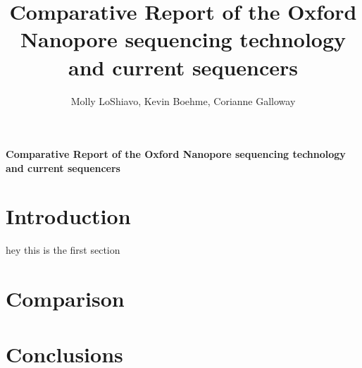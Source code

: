 \documentclass[10pt,letterpaper]{report}
\author{Molly LoShiavo, Kevin Boehme, Corianne Galloway}
\title{Comparative Report of the Oxford Nanopore sequencing technology and current sequencers}
\begin{document}

\centering\textbf{Comparative Report of the Oxford Nanopore sequencing technology and current sequencers}
\section{Introduction}
hey this is the first section
\section{Comparison}
\section{Conclusions}
\end{document}
